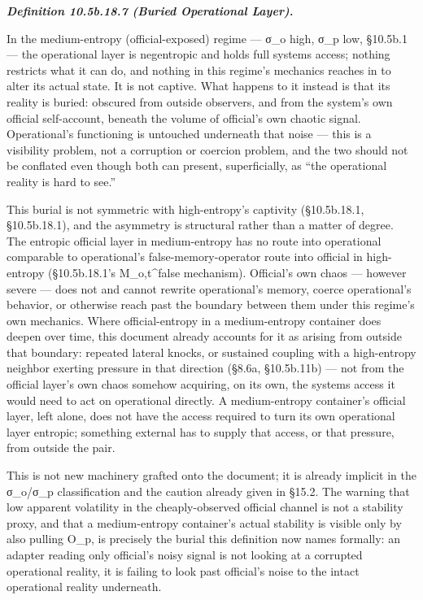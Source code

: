 \documentclass[
]{article}
\begin{document}
\emph{\textbf{Definition 10.5b.18.7 (Buried Operational Layer).}}

In the medium-entropy (official-exposed) regime --- σ\_o high, σ\_p low,
§10.5b.1 --- the operational layer is negentropic and holds full systems
access; nothing restricts what it can do, and nothing in this regime's
mechanics reaches in to alter its actual state. It is not captive. What
happens to it instead is that its reality is buried: obscured from
outside observers, and from the system's own official self-account,
beneath the volume of official's own chaotic signal. Operational's
functioning is untouched underneath that noise --- this is a visibility
problem, not a corruption or coercion problem, and the two should not be
conflated even though both can present, superficially, as ``the
operational reality is hard to see.''

This burial is not symmetric with high-entropy's captivity (§10.5b.18.1,
§10.5b.18.1), and the asymmetry is structural rather than a matter of
degree. The entropic official layer in medium-entropy has no route into
operational comparable to operational's false-memory-operator route into
official in high-entropy (§10.5b.18.1's M\_o,t\^{}false mechanism).
Official's own chaos --- however severe --- does not and cannot rewrite
operational's memory, coerce operational's behavior, or otherwise reach
past the boundary between them under this regime's own mechanics. Where
official-entropy in a medium-entropy container does deepen over time,
this document already accounts for it as arising from outside that
boundary: repeated lateral knocks, or sustained coupling with a
high-entropy neighbor exerting pressure in that direction (§8.6a,
§10.5b.11b) --- not from the official layer's own chaos somehow
acquiring, on its own, the systems access it would need to act on
operational directly. A medium-entropy container's official layer, left
alone, does not have the access required to turn its own operational
layer entropic; something external has to supply that access, or that
pressure, from outside the pair.

This is not new machinery grafted onto the document; it is already
implicit in the σ\_o/σ\_p classification and the caution already given
in §15.2. The warning that low apparent volatility in the
cheaply-observed official channel is not a stability proxy, and that a
medium-entropy container's actual stability is visible only by also
pulling O\_p, is precisely the burial this definition now names
formally: an adapter reading only official's noisy signal is not looking
at a corrupted operational reality, it is failing to look past
official's noise to the intact operational reality underneath.
\end{document}
